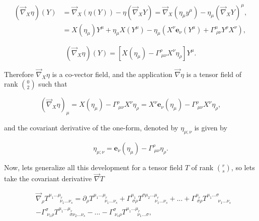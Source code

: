         \begin{align*}
            \left(\Vec{\nabla}_X\eta \right)(Y) &= \Vec{\nabla}_X\left(\eta(Y)\right) - \eta\left(\Vec{\nabla}_XY\right) = \Vec{\nabla}_X \left(\eta_{\mu}y^{\mu} \right) - \eta_{\mu}\left(\Vec{\nabla}_XY\right)^{\mu},\\
            &= X(\eta_{\mu})Y^{\mu} + \eta_{\mu}X(Y^{\mu}) - \eta_{\mu}\left(X^{\nu}\mathbf{e}_{\nu}(Y^{\mu}) + \Gamma^{\mu}_{\;\rho\nu}Y^{\rho}X^{\nu} \right),
        \end{align*}

        \begin{equation}
            \left(\Vec{\nabla}_X\eta \right)(Y) = \left[X(\eta_{\mu}) - \Gamma^{\rho}_{\;\mu\nu}X^{\nu} \eta_{\rho} \right]Y^{\mu}.
        \end{equation}

        Therefore $\Vec{\nabla}_X\eta$ is a co-vector field, and the application $\Vec{\nabla}\eta$ is a tensor field of rank $\binom{0}{2}$ such that

        \begin{equation}
            \left(\Vec{\nabla}_X\eta \right)_{\mu} = X(\eta_{\mu}) - \Gamma^{\rho}_{\;\mu\nu}X^{\nu}\eta_{\rho} = X^{\nu}\mathbf{e}_{\nu}(\eta_{\mu}) - \Gamma^{\rho}_{\;\mu\nu}X^{\nu}\eta_{\rho},
        \end{equation}

        and the covariant derivative of the one-form, denoted by $\eta_{\mu;\nu}$ is given by

        \begin{equation}
            \eta_{\mu;\nu} = \mathbf{e}_{\nu}(\eta_{\mu}) - \Gamma^{\rho}_{\;\mu\nu}\eta_{\rho}.
        \end{equation}

        Now, lets generalize all this development for a tensor field $T$ of rank $\binom{r}{s}$, so lets take the covariant derivative $\Vec{\nabla}T$

        \begin{align*}
            &\Vec{\nabla}_{\rho}T^{\mu_1...\mu_r}_{\;\qquad\nu_1...\nu_s} = \partial_{\rho}T^{\mu_1...\mu_r}_{\;\qquad\nu_1...\nu_s} + \Gamma^{\mu_1}_{\;\sigma\rho}T^{\sigma\mu_2...\mu_r}_{\;\qquad\;\nu_1...\nu_s} +...+\Gamma^{\mu_r}_{\;\sigma\rho}T^{\mu_1...\sigma}_{\;\qquad\nu_1...\nu_s}\\
            &-\Gamma^{\sigma}_{\;\nu_1\rho}T^{\mu_1...\mu_r}_{\;\qquad\sigma\nu_2...\nu_s} - ... - \Gamma^{\sigma}_{\;\nu_s\rho}T^{\mu_1...\mu_r}_{\;\qquad\nu_1...\sigma},
        \end{align*}


